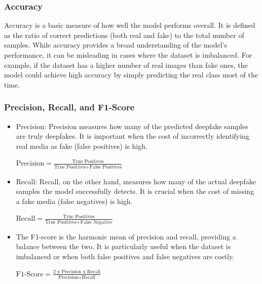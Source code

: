 \documentclass[lettersize,journal]{IEEEtran}
\begin{document}
\subsubsection{Accuracy}

Accuracy is a basic measure of how well the model performs overall. It is defined as the ratio of correct predictions (both real and fake) to the total number of samples. While accuracy provides a broad understanding of the model’s performance, it can be misleading in cases where the dataset is imbalanced. For example, if the dataset has a higher number of real images than fake ones, the model could achieve high accuracy by simply predicting the real class most of the time.
\cite{qawasmi2025detecting}
\subsubsection{Precision, Recall, and F1-Score}

\begin{itemize}
    \item Precision: Precision measures how many of the predicted deepfake samples are truly deepfakes. It is important when the cost of incorrectly identifying real media as fake (false positives) is high.

\vspace{0.1in}

    $\text{Precision} = \frac{\text{True Positives}}{\text{True Positives} + \text{False Positives}}$
   
    \vspace{0.1in}
    
    \item  Recall: Recall, on the other hand, measures how many of the actual deepfake samples the model successfully detects. It is crucial when the cost of missing a fake media (false negatives) is high.\cite{kaur2024deepfake}

    \vspace{0.1in}

    $\text{Recall} = \frac{\text{True Positives}}{\text{True Positives} + \text{False Negative}}$

\vspace{0.1in}

    \item The F1-score is the harmonic mean of precision and recall, providing a balance between the two. It is particularly useful when the dataset is imbalanced or when both false positives and false negatives are costly.

     \vspace{0.1in}

$\text{F1-Score} = \frac{\text{2 x Precision x Recall}}{\text{Precision} + \text{Recall}}$
     
\end{itemize}
\end{document}
